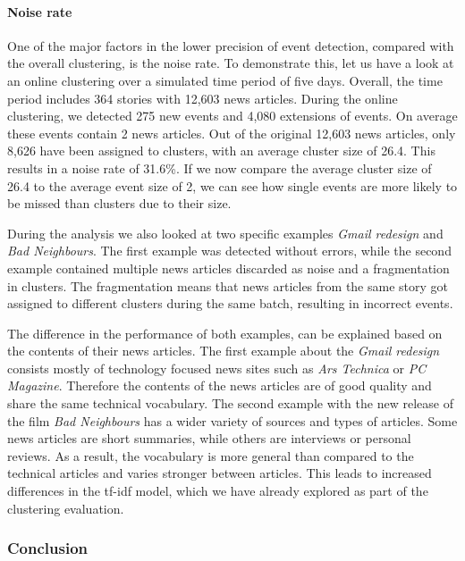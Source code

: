\paragraph{Noise rate}
One of the major factors in the lower precision of event detection,
compared with the overall clustering, is the noise rate.
To demonstrate this, let us have a look at an online clustering over a simulated time period of five days.
Overall, the time period includes 364 stories with 12,603 news articles.
During the online clustering, we detected 275 new events and 4,080 extensions of events.
On average these events contain 2 news articles.
Out of the original 12,603 news articles, only 8,626 have been assigned to clusters,
with an average cluster size of 26.4.
This results in a noise rate of 31.6\%.
If we now compare the average cluster size of 26.4 to the average event size of 2,
we can see how single events are more likely to be missed than clusters due to their size.

During the analysis we also looked at two specific examples \textit{Gmail redesign} and \textit{Bad Neighbours}.
The first example was detected without errors,
while the second example contained multiple news articles discarded as noise and a fragmentation in clusters.
The fragmentation means that news articles from the same story got assigned to different clusters during the same batch,
resulting in incorrect events.

The difference in the performance of both examples, can be explained based on the contents of their news articles.
The first example about the \textit{Gmail redesign} consists mostly of technology focused news sites
such as \textit{Ars Technica} or \textit{PC Magazine}.
Therefore the contents of the news articles are of good quality and share the same technical vocabulary.
The second example with the new release of the film \textit{Bad Neighbours}
has a wider variety of sources and types of articles.
Some news articles are short summaries, while others are interviews or personal reviews.
As a result, the vocabulary is more general than compared to the technical articles and varies stronger between articles.
This leads to increased differences in the tf-idf model,
which we have already explored as part of the clustering evaluation.

\subsubsection{Conclusion}
\label{subsubsec:5b_conclusion}

